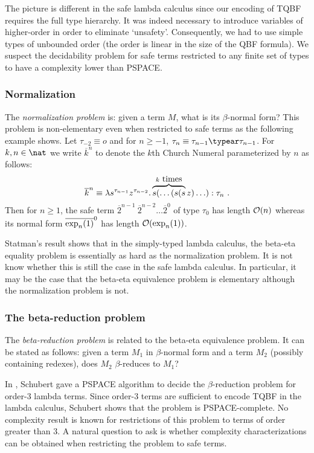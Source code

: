 The picture is different in the safe lambda calculus since our
encoding of TQBF requires the full type hierarchy. It
was indeed necessary to introduce variables of higher-order in order
to eliminate `unsafety'. Consequently, we had to use simple types of
unbounded order (the order is linear in the size of the QBF
formula). We suspect the decidability problem for safe terms
restricted to any finite set of types to have a complexity lower
than PSPACE.


\subsubsection{Normalization}
The \emph{normalization problem} is: given a term $M$, what is its $\beta$-normal form? This problem is non-elementary even when restricted to safe terms as the following example shows. Let $\tau_{-2}
\equiv o$ and for $n\geq -1$, $\tau_n \equiv \tau_{n-1}\typear
\tau_{n-1}$. For $k,n\in \nat$ we write $\overline{k}^n$ to denote
the $k$th Church Numeral parameterized by $n$ as follows:
$$\overline{k}^n \equiv \lambda s^{\tau_{n-1}}
z^{\tau_{n-2}} . \overbrace{s( \ldots (s (s}^{k\hbox{ times}}z)
\ldots) : \tau_n \ .$$ Then for $n\geq1$, the safe term
$\overline{2}^{n-1}~\overline{2}^{n-2}\ldots \overline{2}^0$ of type
$\tau_0$ has length $\mathcal{O}(n)$ whereas its normal form
$\overline{\exp_{n}(1)}^0$ has length $\mathcal{O}(\exp_{n}(1))$.

Statman's result shows that in the simply-typed lambda calculus, the beta-eta equality problem is essentially as hard as the
normalization problem. It is not know whether this is still the case in the safe lambda calculus. In particular, it may be the case that the
beta-eta equivalence problem is elementary although the normalization problem is not.

\subsubsection{The beta-reduction problem}
The \emph{beta-reduction problem} is related to the beta-eta equivalence problem. It can be stated as follows: given a term $M_1$ in $\beta$-normal form and a term $M_2$ (possibly containing redexes), does $M_2$ $\beta$-reduces to $M_1$?

In \cite{schubert2001cbr}, Schubert
gave a PSPACE algorithm to decide the $\beta$-reduction problem for order-$3$
lambda terms. Since order-$3$ terms are sufficient to encode TQBF in the lambda calculus, Schubert shows that the problem is PSPACE-complete. No complexity result is known for restrictions of this problem to terms of order greater than $3$. A natural question to ask is whether complexity characterizations can be obtained when restricting the problem to safe terms.
